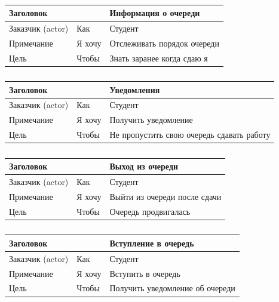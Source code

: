 \begin{table}[h!tp]
    \centering
    \caption{}
    \label{table:user_story:info:stud}
    \begin{tabular}{|l|l|l|}
        \hline \multicolumn{2}{|l|}{Заголовок} & Информация о очереди\\ \hline
        Заказчик (actor) & Как & Студент \\ \hline
        Примечание & Я хочу & Отслеживать порядок очереди\\ \hline
        Цель & Чтобы & Знать заранее когда сдаю я\\ \hline
    \end{tabular}
\end{table}
\begin{table}[h!tp]
    \centering
    \caption{}
    \label{table:user_story:notify}
    \begin{tabular}{|l|l|l|}
        \hline \multicolumn{2}{|l|}{Заголовок} & Уведомления\\ \hline
        Заказчик (actor) & Как & Студент \\ \hline
        Примечание & Я хочу & Получить уведомление\\ \hline
        Цель & Чтобы & Не пропустить свою очередь сдавать работу\\ \hline
    \end{tabular}
\end{table}
\begin{table}[h!tp]
    \centering
    \caption{}
    \label{table:user_story:exit}
    \begin{tabular}{|l|l|l|}
        \hline \multicolumn{2}{|l|}{Заголовок} & Выход из очереди\\ \hline
        Заказчик (actor) & Как & Студент \\ \hline
        Примечание & Я хочу & Выйти из очереди после сдачи\\ \hline
        Цель & Чтобы & Очередь продвигалась\\ \hline
    \end{tabular}
\end{table}
\begin{table}[h!tp]
    \centering
    \caption{}
    \label{table:user_story:entrance}
    \begin{tabular}{|l|l|l|}
        \hline \multicolumn{2}{|l|}{Заголовок} & Вступление в очередь\\ \hline
        Заказчик (actor) & Как & Студент \\ \hline
        Примечание & Я хочу & Вступить в очередь\\ \hline
        Цель & Чтобы & Получить уведомление об очереди\\ \hline
    \end{tabular}
\end{table}
